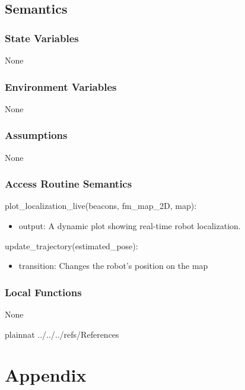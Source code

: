 \documentclass[12pt, titlepage]{article}
\begin{document}
\subsection{Semantics}

\subsubsection{State Variables}
None

\subsubsection{Environment Variables}
None

\subsubsection{Assumptions}
None

\subsubsection{Access Routine Semantics}

\noindent plot\_localization\_live(beacons, fm\_map\_2D, map):
\begin{itemize}
\item output: A dynamic plot showing real-time robot localization.
\end{itemize}

\noindent update\_trajectory(estimated\_pose):
\begin{itemize}
\item transition: Changes the robot's position on the map
\end{itemize}


\subsubsection{Local Functions}
None

\newpage


 {plainnat}
 {../../../refs/References}

\newpage

\section{Appendix} \label{Appendix}

\end{document}
